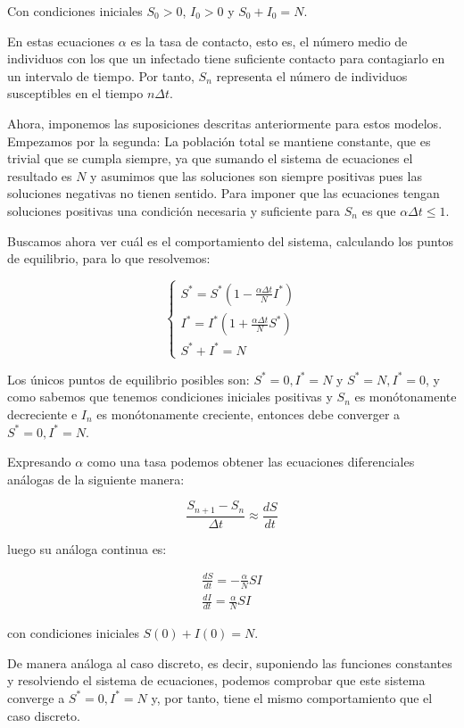 Con condiciones iniciales $S_0>0$, $I_0>0$ y $S_0+I_0=N$.

En estas ecuaciones $\alpha$ es la tasa de contacto, esto es, el número medio de individuos con los que un infectado tiene suficiente contacto para contagiarlo en un intervalo de tiempo. Por tanto, $S_n$ representa el número de individuos susceptibles en el tiempo $n\Delta t$.

Ahora, imponemos las suposiciones descritas anteriormente para estos modelos. Empezamos por la segunda: La población total se mantiene constante, que es trivial que se cumpla siempre, ya que sumando el sistema de ecuaciones el resultado es $N$ y asumimos que las soluciones son siempre positivas pues las soluciones negativas no tienen sentido.
Para imponer que las ecuaciones tengan soluciones positivas una condición necesaria y suficiente para $S_n$ es que $\alpha\Delta t \leq 1$. 

Buscamos ahora ver cuál es el comportamiento del sistema, calculando los puntos de equilibrio, para lo que resolvemos:

$$
\begin{cases}
S^*=S^*\left( 1-\frac{\alpha\Delta t}{N}I^*\right) \\
I^*=I^*\left( 1+\frac{\alpha\Delta t}{N}S^*\right) \\
S^*+I^*=N
\end{cases}
$$

Los únicos puntos de equilibrio posibles son: $S^*=0, I^*=N$ y $S^*=N, I^*=0$, y como sabemos que tenemos condiciones iniciales positivas y $S_n$ es monótonamente decreciente e $I_n$ es monótonamente creciente, entonces debe converger a $S^*=0, I^*=N$.

Expresando $\alpha$ como una tasa podemos obtener las ecuaciones diferenciales análogas de la siguiente manera:

$$\frac{S_{n+1} - S_n}{\Delta t} \approx \frac{dS}{dt}$$

luego su análoga continua es:

\begin{equation}
\begin{aligned}
\frac{dS}{dt} = -\frac{\alpha}{N}SI \\
\frac{dI}{dt} = \frac{\alpha}{N}SI
\end{aligned}
\end{equation}

con condiciones iniciales $S(0)+I(0)=N$.

De manera análoga al caso discreto, es decir, suponiendo las funciones constantes y resolviendo el sistema de ecuaciones, podemos comprobar que este sistema converge a $S^*=0, I^*=N$ y, por tanto, tiene el mismo comportamiento que el caso discreto.

